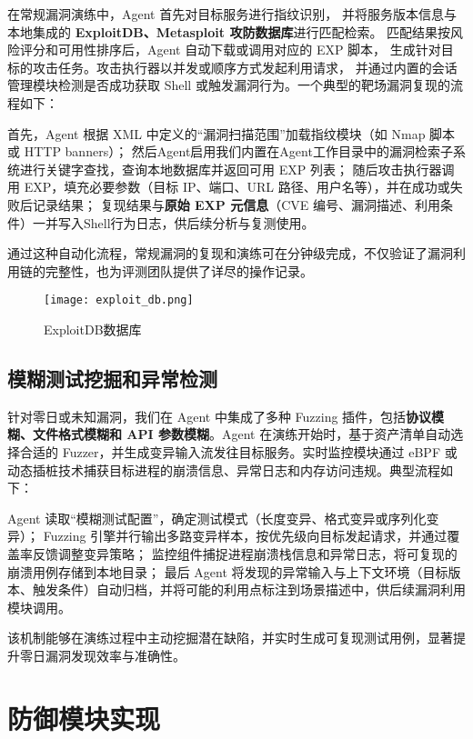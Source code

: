 \documentclass[lang=cn,10pt]{elegantbook}
\begin{document}
在常规漏洞演练中，Agent 首先对目标服务进行指纹识别，
并将服务版本信息与本地集成的 \textbf{ExploitDB、Metasploit 攻防数据库}进行匹配检索。
匹配结果按风险评分和可用性排序后，Agent 自动下载或调用对应的 EXP 脚本，
生成针对目标的攻击任务。攻击执行器以并发或顺序方式发起利用请求，
并通过内置的会话管理模块检测是否成功获取 Shell 或触发漏洞行为。一个典型的靶场漏洞复现的流程如下：

首先，Agent 根据 XML 中定义的“漏洞扫描范围”加载指纹模块（如 Nmap 脚本或 HTTP banners）；  
然后Agent启用我们内置在Agent工作目录中的漏洞检索子系统进行关键字查找，查询本地数据库并返回可用 EXP 列表；  
随后攻击执行器调用 EXP，填充必要参数（目标 IP、端口、URL 路径、用户名等），并在成功或失败后记录结果；  
复现结果与\textbf{原始 EXP 元信息}（CVE 编号、漏洞描述、利用条件）一并写入Shell行为日志，供后续分析与复测使用。

通过这种自动化流程，常规漏洞的复现和演练可在分钟级完成，不仅验证了漏洞利用链的完整性，也为评测团队提供了详尽的操作记录。

\begin{figure}[htbp]
\centering
\texttt{[image: exploit\_db.png]}  %
\caption{ExploitDB数据库}  %
\label{fig:ExploitDB}  %
\end{figure}

\subsection{模糊测试挖掘和异常检测}

针对零日或未知漏洞，我们在 Agent 中集成了多种 Fuzzing 插件，包括\textbf{协议模糊、文件格式模糊和 API 参数模糊}。Agent 在演练开始时，基于资产清单自动选择合适的 Fuzzer，并生成变异输入流发往目标服务。实时监控模块通过 eBPF 或动态插桩技术捕获目标进程的崩溃信息、异常日志和内存访问违规。典型流程如下：

Agent 读取“模糊测试配置”，确定测试模式（长度变异、格式变异或序列化变异）；  
Fuzzing 引擎并行输出多路变异样本，按优先级向目标发起请求，并通过覆盖率反馈调整变异策略；  
监控组件捕捉进程崩溃栈信息和异常日志，将可复现的崩溃用例存储到本地目录；  
最后 Agent 将发现的异常输入与上下文环境（目标版本、触发条件）自动归档，并将可能的利用点标注到场景描述中，供后续漏洞利用模块调用。

该机制能够在演练过程中主动挖掘潜在缺陷，并实时生成可复现测试用例，显著提升零日漏洞发现效率与准确性。


\section{防御模块实现}
\end{document}
